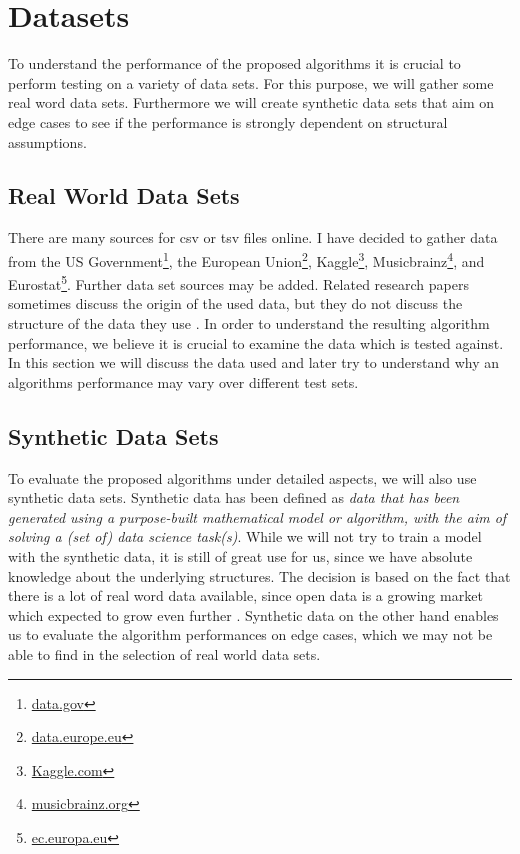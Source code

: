 \chapter{Datasets}
To understand the performance of the proposed algorithms it is crucial to perform testing on a variety of data sets. For this purpose, we will gather some real word data sets. Furthermore we will create synthetic data sets that aim on edge cases to see if the performance is strongly dependent on structural assumptions.

\section{Real World Data Sets}
There are many sources for csv or tsv files online. I have decided to gather data from the US Government\footnote{\href{https://data.gov}{data.gov}}, the European Union\footnote{\href{https://data.europe.eu}{data.europe.eu}}, Kaggle\footnote{\href{https://kaggle.com}{Kaggle.com}}, Musicbrainz\footnote{\href{https://musicbrainz.org/}{musicbrainz.org}}, and Eurostat\footnote{\href{https://musicbrainz.org/}{ec.europa.eu}}. Further data set sources may be added. Related research papers sometimes discuss the origin of the used data, but they do not discuss the structure of the data they use \cite{papenbrock2017data,bauckmann2006efficiently, dursch2019inclusion, rostin2009machine}. In order to understand the resulting algorithm performance, we believe it is crucial to examine the data which is tested against. In this section we will discuss the data used and later try to understand why an algorithms performance may vary over different test sets.

\section{Synthetic Data Sets}
To evaluate the proposed algorithms under detailed aspects, we will also use synthetic data sets. Synthetic data has been defined as \textit{data that has been generated using a purpose-built mathematical model or algorithm, with the aim of solving a (set of) data science task(s)}\cite{jordon2022synthetic}. While we will not try to train a model with the synthetic data, it is still of great use for us, since we have absolute knowledge about the underlying structures. The decision is based on the fact that there is a lot of real word data available, since open data is a growing market which expected to grow even further \cite{EUopenData}. Synthetic data on the other hand enables us to evaluate the algorithm performances on edge cases, which we may not be able to find in the selection of real world data sets. \\

